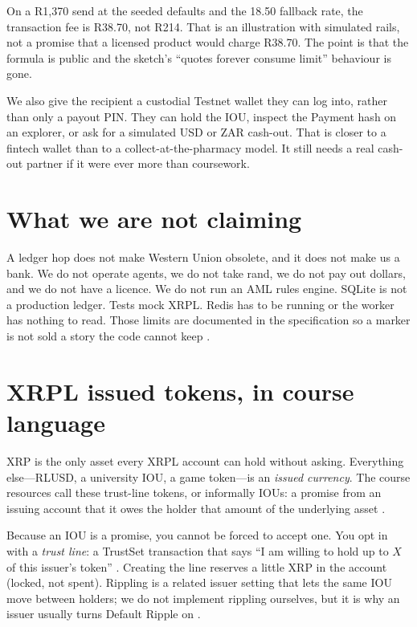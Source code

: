 \documentclass[11pt]{article}
\begin{document}
On a R1{,}370 send at the seeded defaults and the 18.50 fallback rate, the transaction fee is R38.70, not R214. That is an illustration with simulated rails, not a promise that a licensed product would charge R38.70. The point is that the formula is public and the sketch's ``quotes forever consume limit'' behaviour is gone.

We also give the recipient a custodial Testnet wallet they can log into, rather than only a payout PIN. They can hold the IOU, inspect the Payment hash on an explorer, or ask for a simulated USD or ZAR cash-out. That is closer to a fintech wallet than to a collect-at-the-pharmacy model. It still needs a real cash-out partner if it were ever more than coursework.

\section{What we are not claiming}
A ledger hop does not make Western Union obsolete, and it does not make us a bank. We do not operate agents, we do not take rand, we do not pay out dollars, and we do not have a licence. We do not run an AML rules engine. SQLite is not a production ledger. Tests mock XRPL. Redis has to be running or the worker has nothing to read. Those limits are documented in the specification so a marker is not sold a story the code cannot keep \citep{UCTBrief2026}.

\section{XRPL issued tokens, in course language}
XRP is the only asset every XRPL account can hold without asking. Everything else---RLUSD, a university IOU, a game token---is an \emph{issued currency}. The course resources call these trust-line tokens, or informally IOUs: a promise from an issuing account that it owes the holder that amount of the underlying asset \citep{UCTResources2026,XRPLIssued}.

Because an IOU is a promise, you cannot be forced to accept one. You opt in with a \emph{trust line}: a TrustSet transaction that says ``I am willing to hold up to $X$ of this issuer's token'' \citep{XRPLTrustLines}. Creating the line reserves a little XRP in the account (locked, not spent). Rippling is a related issuer setting that lets the same IOU move between holders; we do not implement rippling ourselves, but it is why an issuer usually turns Default Ripple on \citep{UCTResources2026}.
\end{document}
